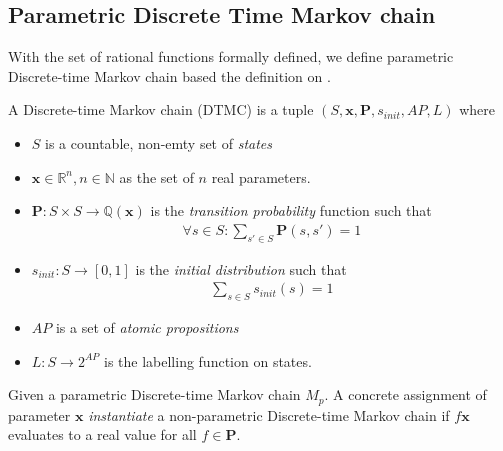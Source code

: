 \subsection{Parametric Discrete Time Markov chain}
With the set of rational functions formally defined, we define parametric Discrete-time Markov chain based the definition on \cite{junges2019parameter}.
\begin{definition}
    A Discrete-time Markov chain (DTMC) is a tuple $(S, \mathbf{x}, \mathbf{P}, s_{init}, AP, L)$ where
    \begin{itemize}
        \item $S$ is a countable, non-emty set of \textit{states}
        \item $\mathbf{x} \in \mathbb{R}^n, n \in \mathbb{N}$ as the set of $n$ real parameters.
        \item $\mathbf{P}:S\times S \rightarrow \mathbb{Q}(\mathbf{x})$ is the \textit{transition probability}
              function such that
              \begin{align*}
                  \forall s \in S : \sum_{s'\in S}\mathbf{P}(s, s') = 1
              \end{align*}
        \item $s_{init}: S \rightarrow [0,1]$ is the \textit{initial distribution} such that
              \begin{align*}
                  \sum_{s\in S}s_{init}(s) = 1
              \end{align*}
        \item $AP$ is a set of \textit{atomic propositions}
        \item $L: S \rightarrow 2^{AP}$ is the labelling function on states.
    \end{itemize}
\end{definition}

Given a parametric Discrete-time Markov chain $M_p$. A concrete assignment of parameter $\mathbf{x}$ \textit{instantiate} a non-parametric Discrete-time Markov chain if $f{\mathbf{x}}$ evaluates to a real value for all $f\in\mathbf{P}$.